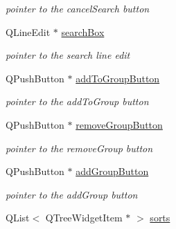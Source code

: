 \begin{DoxyCompactItemize}
\begin{DoxyCompactList}\small\item\em pointer to the cancel\-Search button \end{DoxyCompactList}\item 
\hypertarget{class_tree_area_a609dd67c5b1d7bb8d0661054338f9561}{\-Q\-Line\-Edit $\ast$ \hyperlink{class_tree_area_a609dd67c5b1d7bb8d0661054338f9561}{search\-Box}}\label{class_tree_area_a609dd67c5b1d7bb8d0661054338f9561}

\begin{DoxyCompactList}\small\item\em pointer to the search line edit \end{DoxyCompactList}\item 
\hypertarget{class_tree_area_ab77bb00c229d79b09736ff7948f1fc32}{\-Q\-Push\-Button $\ast$ \hyperlink{class_tree_area_ab77bb00c229d79b09736ff7948f1fc32}{add\-To\-Group\-Button}}\label{class_tree_area_ab77bb00c229d79b09736ff7948f1fc32}

\begin{DoxyCompactList}\small\item\em pointer to the add\-To\-Group button \end{DoxyCompactList}\item 
\hypertarget{class_tree_area_ab1bb8dfaad1425a3b1fcd48f75f140f2}{\-Q\-Push\-Button $\ast$ \hyperlink{class_tree_area_ab1bb8dfaad1425a3b1fcd48f75f140f2}{remove\-Group\-Button}}\label{class_tree_area_ab1bb8dfaad1425a3b1fcd48f75f140f2}

\begin{DoxyCompactList}\small\item\em pointer to the remove\-Group button \end{DoxyCompactList}\item 
\hypertarget{class_tree_area_a6e20bfd0bba99c036d7909d246a3fffa}{\-Q\-Push\-Button $\ast$ \hyperlink{class_tree_area_a6e20bfd0bba99c036d7909d246a3fffa}{add\-Group\-Button}}\label{class_tree_area_a6e20bfd0bba99c036d7909d246a3fffa}

\begin{DoxyCompactList}\small\item\em pointer to the add\-Group button \end{DoxyCompactList}\item 
\hypertarget{class_tree_area_a5a049742466ca1b4d0157f866f478e18}{\-Q\-List$<$ \-Q\-Tree\-Widget\-Item $\ast$ $>$ \hyperlink{class_tree_area_a5a049742466ca1b4d0157f866f478e18}{sorts}}\label{class_tree_area_a5a049742466ca1b4d0157f866f478e18}


\end{DoxyCompactItemize}
